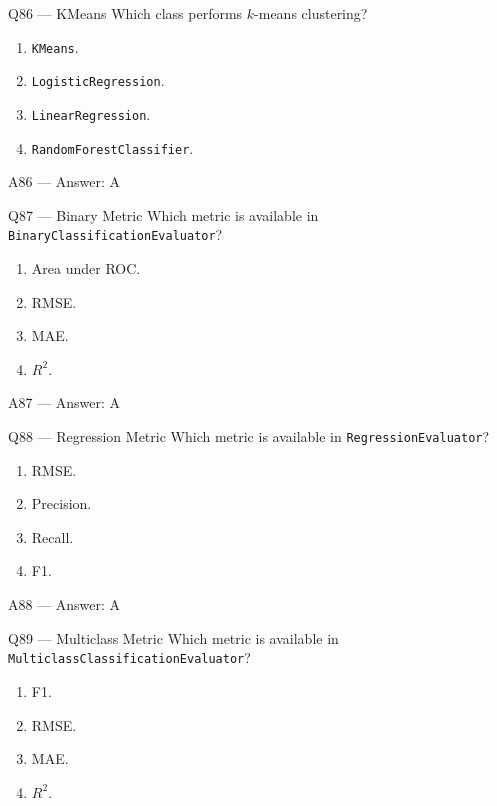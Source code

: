 \documentclass[aspectratio=169,10pt]{beamer}
\begin{document}
	\begin{frame}{Q86 — KMeans}
		Which class performs $k$-means clustering?
		\begin{enumerate}[label=\Alph*.]
			\item \texttt{KMeans}.
			\item \texttt{LogisticRegression}.
			\item \texttt{LinearRegression}.
			\item \texttt{RandomForestClassifier}.
		\end{enumerate}
	\end{frame}
	
	\begin{frame}{A86 — Answer: A}
	\end{frame}
	
	\begin{frame}{Q87 — Binary Metric}
		Which metric is available in \texttt{BinaryClassificationEvaluator}?
		\begin{enumerate}[label=\Alph*.]
			\item Area under ROC.
			\item RMSE.
			\item MAE.
			\item $R^2$.
		\end{enumerate}
	\end{frame}
	
	\begin{frame}{A87 — Answer: A}
	\end{frame}
	
	\begin{frame}{Q88 — Regression Metric}
		Which metric is available in \texttt{RegressionEvaluator}?
		\begin{enumerate}[label=\Alph*.]
			\item RMSE.
			\item Precision.
			\item Recall.
			\item F1.
		\end{enumerate}
	\end{frame}
	
	\begin{frame}{A88 — Answer: A}
	\end{frame}
	
	\begin{frame}{Q89 — Multiclass Metric}
		Which metric is available in \texttt{MulticlassClassificationEvaluator}?
		\begin{enumerate}[label=\Alph*.]
			\item F1.
			\item RMSE.
			\item MAE.
			\item $R^2$.
		\end{enumerate}
	\end{frame}
	
\end{document}
